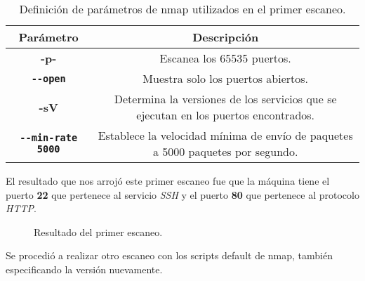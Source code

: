 \documentclass[a4paper]{article} %
\begin{document}
    \begin{table}[ht]
        \centering
        \begin{tabular}{|c|c|}
        \hline
        {\color[HTML]{3B00F6} \textbf{Parámetro}} & {\color[HTML]{3B00F6} \textbf{Descripción}}                                         \\ \hline
        \textbf{-p-}                              & Escanea los 65535 puertos.                                                          \\ \hline
        \textbf{\texttt{{-}{-}open}}                          & Muestra solo los puertos abiertos.                                                  \\ \hline
        \textbf{-sV}                              & Determina la versiones de los servicios que se ejecutan en los puertos encontrados. \\ \hline
        \textbf{\texttt{{-}{-}min-rate 5000}}                  & Establece la velocidad mínima de envío de paquetes a 5000 paquetes por segundo.     \\ \hline
        \end{tabular}
    \captionsetup{labelfont=bf} %
    \caption{Definición de parámetros de nmap utilizados en el primer escaneo.}
    \end{table}

    El resultado que nos arrojó este primer escaneo fue que la máquina tiene el puerto \textbf{22} que pertenece al servicio \textit{SSH} y el puerto \textbf{80} que pertenece al protocolo \textit{HTTP}.

    \begin{figure}[h] %
        \begin{center}
        \setlength{\fboxsep}{0.2em} %
        \end{center}
        \captionsetup{labelfont=bf} %
        \caption{Resultado del primer escaneo.}
    \end{figure}
    
    Se procedió a realizar otro escaneo con los scripts default de nmap, también especificando la versión nuevamente.

    \vspace{0.2cm}
\end{document}

